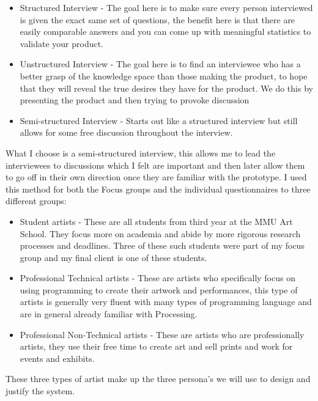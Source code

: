 \documentclass[a4paper]{report}
\begin{document}
\begin{itemize}
\item Structured Interview - The goal here is to make sure every person interviewed is given the exact same set of questions, the benefit here is that there are easily comparable answers and you can come up with meaningful statistics to validate your product.

\item Unstructured Interview - The goal here is to find an interviewee who has a better grasp of the knowledge space than those making the product, to hope that they will reveal the true desires they have for the product. We do this by presenting the product and then trying to provoke discussion

\item Semi-structured Interview - Starts out like a structured interview but still allows for some free discussion throughout the interview.
\end{itemize}

What I choose is a semi-structured interview, this allows me to lead the interviewees to discussions which I felt are important and then later allow them to go off in their own direction once they are familiar with the prototype. I used this method for both the Focus groups and the individual questionnaires to three different groups:

\begin{itemize}
\item Student artists - These are all students from third year at the MMU Art School. They focus more on academia and abide by more rigorous research processes and deadlines. Three of these such students were part of my focus group and my final client is one of these students.
\item Professional Technical artists - These are artists who specifically focus on using programming to create their artwork and performances, this type of artists is generally very fluent with many types of programming language and are in general already familiar with Processing\cite{PROCESSING}.
\item Professional Non-Technical artists - These are artists who are professionally artists, they use their free time to create art and sell prints and work for events and exhibits.
\end{itemize}

These three types of artist make up the three persona's we will use to design and justify the system.
\end{document}
